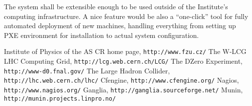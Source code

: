 \documentclass{article}
\begin{document}
The system shall be extensible enough to be used outside of the Institute's computing infrastructure.  A nice feature would be
also a ``one-click'' tool for fully automated deployment of new machines, handling everything from setting up PXE environment for
installation to actual system configuration.


\begin{thebibliography}{9}
    Institute of Physics of the AS CR home page, {\tt http://www.fzu.cz/}
    The W-LCG LHC Computing Grid, {\tt http://lcg.web.cern.ch/LCG/}
    The DZero Experiment, {\tt http://www-d0.fnal.gov/}
    The Large Hadron Collider, {\tt http://lhc.web.cern.ch/lhc/}
    Cfengine, {\tt http://www.cfengine.org/}
    Nagios, {\tt http://www.nagios.org/}
    Ganglia, {\tt http://ganglia.sourceforge.net/}
    Munin, {\tt http://munin.projects.linpro.no/}
\end{thebibliography}
\end{document}
